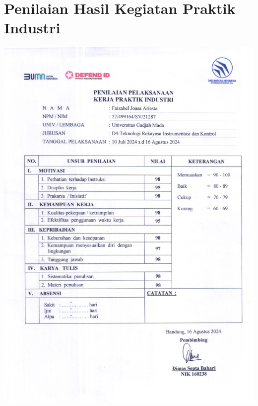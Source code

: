 \section{Penilaian Hasil Kegiatan Praktik Industri}
\includegraphics[scale=0.7]{dokumen/nilai-perusahaan.pdf}

\newpage
